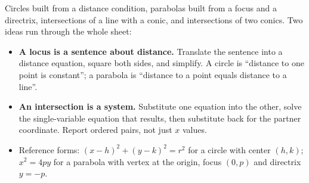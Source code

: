 \documentclass[12pt]{article}
\begin{document}

\noindent\small
Circles built from a distance condition, parabolas built from a focus and a
directrix, intersections of a line with a conic, and intersections of two
conics. Two ideas run through the whole sheet:
\begin{itemize}[leftmargin=1.1cm, itemsep=1pt, topsep=2pt]
  \item \textbf{A locus is a sentence about distance.} Translate the sentence
        into a distance equation, square both sides, and simplify. A circle is
        ``distance to one point is constant''; a parabola is ``distance to a
        point equals distance to a line''.
  \item \textbf{An intersection is a system.} Substitute one equation into the
        other, solve the single-variable equation that results, then substitute
        back for the partner coordinate. Report ordered pairs, not just
        $x$ values.
  \item Reference forms: $(x-h)^2 + (y-k)^2 = r^2$ for a circle with center
        $(h, k)$; $x^2 = 4py$ for a parabola with vertex at the origin, focus
        $(0, p)$ and directrix $y = -p$.
\end{itemize}
\normalsize

\vspace{0.2cm}





\end{document}
